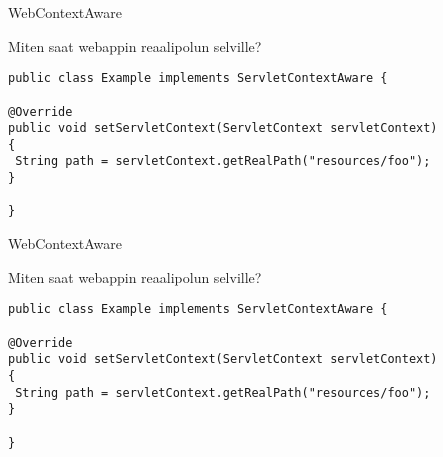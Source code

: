 \documentclass[hyperref={pdfauthor=\AUTHOR},14pt]{beamer}
\author{\AUTHOR}
\title[\TITLE]{\TITLE}
\date{\DATE}
\begin{document}
\begin{frame}[plain]
\titlepage
\end{frame}

\begin{frame}[t,fragile]{WebContextAware}

Miten saat webappin reaalipolun selville?

\lstset{language=Java,style=Java}
\begin{lstlisting}
public class Example implements ServletContextAware {

@Override
public void setServletContext(ServletContext servletContext)
{
 String path = servletContext.getRealPath("resources/foo");
}

}
\end{lstlisting}
\end{frame}

\begin{frame}[t,fragile]{WebContextAware}

Miten saat webappin reaalipolun selville?

\lstset{language=Java,style=Java}
\begin{lstlisting}
public class Example implements ServletContextAware {

@Override
public void setServletContext(ServletContext servletContext)
{
 String path = servletContext.getRealPath("resources/foo");
}

}
\end{lstlisting}
\end{frame}
\end{document}
